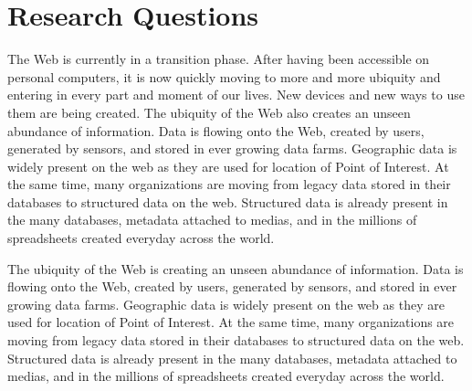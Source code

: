 \begin{figure}[ht!]
\end{figure}



\section{Research Questions}
\label{sec:questions}

The Web is currently in a transition phase. After having been accessible on personal computers, it is now 
quickly moving to more and more ubiquity and entering in every part and moment of our lives. New 
devices and new ways to use them are being created. The ubiquity of the Web also creates an unseen 
abundance of information. Data is flowing onto the Web, created by users, generated by sensors, and 
stored in ever growing data farms. Geographic data is widely present on the web as they are used for location 
of Point of Interest. At the same time, many organizations are moving from legacy data stored in their databases
to structured data on the web. Structured data is already present in the many databases, metadata attached to medias, and in the millions of spreadsheets created everyday across the world. 

The ubiquity of the Web is creating an unseen abundance of information. Data is flowing onto the Web, created by users, generated by sensors, and stored in ever growing data farms. Geographic data is widely present on the web as they are used for location of Point of Interest. At the same time, many organizations are moving from legacy data stored in their databases to structured data on the web. Structured data is already present in the many databases, metadata attached to medias, and in the millions of spreadsheets created everyday across the world.




